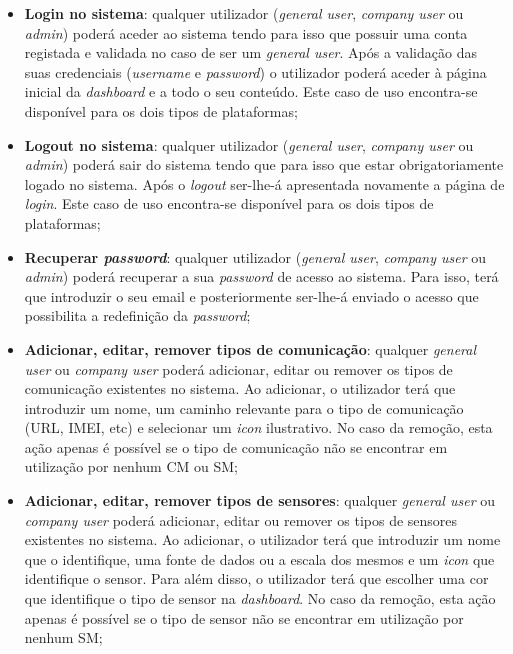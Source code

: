 \begin{itemize}
	\item \textbf{Login no sistema}: qualquer utilizador (\textit{general user}, \textit{company user} ou \textit{admin}) poderá aceder ao sistema tendo para isso que possuir uma conta registada e validada no caso de ser um \textit{general user}. Após a validação das suas credenciais (\textit{username} e \textit{password}) o utilizador poderá aceder à página inicial da \textit{dashboard} e a todo o seu conteúdo. Este caso de uso encontra-se disponível para os dois tipos de plataformas; 
	
	
	\item \textbf{Logout no sistema}: qualquer utilizador (\textit{general user}, \textit{company user} ou \textit{admin}) poderá sair do sistema tendo que para isso que estar obrigatoriamente logado no sistema. Após o \textit{logout} ser-lhe-á apresentada novamente a página de \textit{login}. Este caso de uso encontra-se disponível para os dois tipos de plataformas; 
	
	
	\item \textbf{Recuperar \textit{password}}: qualquer utilizador (\textit{general user}, \textit{company user} ou \textit{admin}) poderá recuperar a sua \textit{password} de acesso ao sistema. Para isso, terá que introduzir o seu email e posteriormente ser-lhe-á enviado o acesso que possibilita a redefinição da \textit{password}; 
	
	
	
	\item \textbf{Adicionar, editar, remover tipos de comunicação}: qualquer \textit{general user} ou \textit{company user} poderá adicionar, editar ou remover os tipos de comunicação existentes no sistema. Ao  adicionar, o utilizador terá que introduzir um nome, um caminho relevante para o tipo de comunicação (\ac{URL}, \ac{IMEI}, etc) e selecionar um \textit{icon} ilustrativo. No caso da remoção, esta ação apenas é possível se o tipo de comunicação não se encontrar em utilização por nenhum \acl{CM} ou \acl{SM};  
	
	\item \textbf{Adicionar, editar, remover tipos de sensores}: qualquer \textit{general user} ou \textit{company user} poderá adicionar, editar ou remover os tipos de sensores existentes no sistema. Ao  adicionar, o utilizador terá que introduzir um nome que o identifique, uma fonte de dados ou a escala dos mesmos e um \textit{icon} que identifique o sensor. Para além disso, o utilizador terá que escolher uma cor que identifique o tipo de sensor na \textit{dashboard}. No caso da remoção, esta ação apenas é possível se o tipo de sensor não se encontrar em utilização por nenhum \acl{SM};   
	 

\end{itemize}
